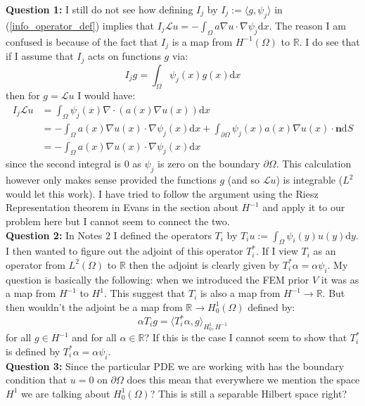 \noindent \textbf{Question 1:} I still do not see how defining $I_j$ by $I_j:=\langle g, \psi_j \rangle$ in (\ref{info_operator_def}) implies that $I_{j}\mathcal{L}u=-\int_{\Omega}a\nabla u \cdot \nabla\psi_{j}\mathrm{d}x$. The reason I am confused is because of the fact that $I_j$ is a map from $H^{-1}(\Omega)$ to $\mathbb{R}$. I do see that if I assume that $I_{j}$ acts on functions $g$ via:
\begin{equation*}
    I_{j}g=\int_{\Omega}\psi_{j}(x)g(x)\mathrm{d}x
\end{equation*}
then for $g=\mathcal{L}u$ I would have:
\begin{align*}
    I_{j}\mathcal{L}u&=\int_{\Omega}\psi_{j}(x)\nabla\cdot(a(x)\nabla u(x))\mathrm{d}x \\
    &=-\int_{\Omega}a(x)\nabla u(x)\cdot\nabla\psi_{j}(x)\mathrm{d}x + \int_{\partial\Omega}\psi_{j}(x)a(x)\nabla u(x)\cdot\mathbf{n}\mathrm{d}S \\
    &=-\int_{\Omega}a(x)\nabla u(x)\cdot\nabla\psi_{j}(x)\mathrm{d}x
\end{align*}
since the second integral is $0$ as $\psi_j$ is zero on the boundary $\partial\Omega$. This calculation however only makes sense provided the functions $g$ (and so $\mathcal{L}u$) is integrable ($L^2$ would let this work). I have tried to follow the argument using the Riesz Representation theorem in Evans in the section about $H^{-1}$ and apply it to our problem here but I cannot seem to connect the two. \\

\noindent \textbf{Question 2:} In Notes 2 I defined the operators $T_{i}$ by $T_{i}u:=\int_{\Omega}\psi_{i}(y)u(y)\mathrm{d}y$. I then wanted to figure out the adjoint of this operator $T_{i}^{*}$. If I view $T_{i}$ as an operator from $L^{2}(\Omega)$ to $\mathbb{R}$ then the adjoint is clearly given by $T_{i}^{*}\alpha=\alpha \psi_{i}$. My question is basically the following: when we introduced the FEM prior $V$ it was as a map from $H^{-1}$ to $H^{1}$. This suggest that $T_{i}$ is also a map from $H^{-1}\rightarrow\mathbb{R}$. But then wouldn't the adjoint be a map from $\mathbb{R}\rightarrow H_{0}^{1}(\Omega)$ defined by:
\begin{equation*}
    \alpha T_{i}g=\langle T_{i}^{*}\alpha, g \rangle_{H_{0}^{1},H^{-1}}
\end{equation*}
for all $g\in H^{-1}$ and for all $\alpha \in \mathbb{R}$? If this is the case I cannot seem to show that $T_{i}^{*}$ is defined by $T_{i}^{*}\alpha=\alpha \psi_{i}$. \\

\noindent \textbf{Question 3:} Since the particular PDE we are working with has the boundary condition that $u=0$ on $\partial\Omega$ does this mean that everywhere we mention the space $H^1$ we are talking about $H_{0}^{1}(\Omega)$? This is still a separable Hilbert space right?
